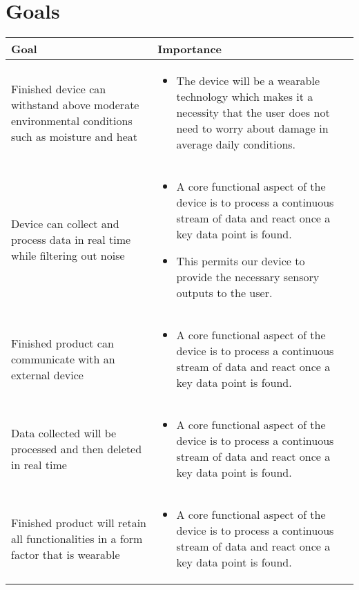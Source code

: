 \documentclass{article}
\begin{document}
\section{Goals}
\begin{tabularx}{1.3\textwidth} { 
    | >{\raggedright\arraybackslash}X 
    | >{\centering\arraybackslash}X 
    | >{\raggedleft\arraybackslash}X | }
   \hline
   Goal & Importance \\
   \hline
   Finished device can withstand above moderate environmental conditions such as moisture and heat  & 
   \begin{itemize}
    \item The device will be a wearable technology which makes it a necessity that the user does not need to worry about damage in average daily conditions.  
   \end{itemize} 
   \\
   \hline
  Device can collect and process data in real time while filtering out noise  & 
  \begin{itemize}
    \item A core functional aspect of the device is to process a continuous stream of data and react once a key data point is found.
    \item This permits our device to provide the necessary sensory outputs to the user.
  \end{itemize} 
   \\
   \hline
   Finished product can communicate with an external device &   
   \begin{itemize}
    \item A core functional aspect of the device is to process a continuous stream of data and react once a key data point is found.
  \end{itemize}  
  \\
   \hline
   Data collected will be processed and then deleted in real time &    
   \begin{itemize}
    \item A core functional aspect of the device is to process a continuous stream of data and react once a key data point is found.
  \end{itemize}  
   \\
   \hline
   Finished product will retain all functionalities in a form factor that is wearable &    
   \begin{itemize}
    \item A core functional aspect of the device is to process a continuous stream of data and react once a key data point is found.

\end{itemize}
\end{tabularx}
\end{document}
